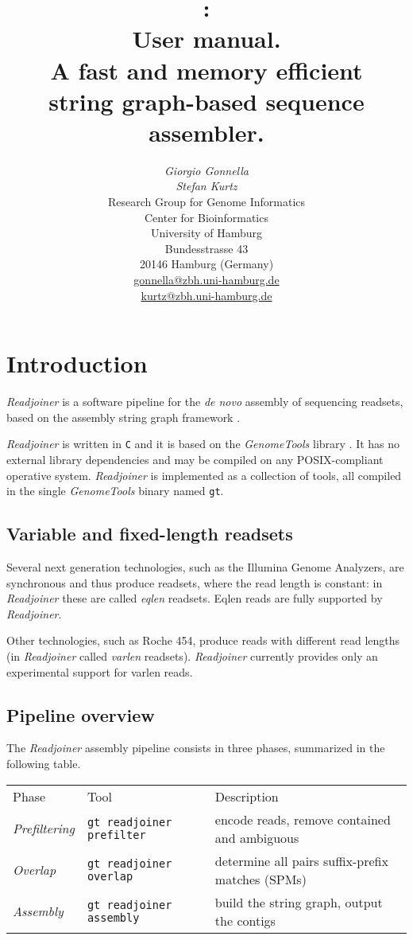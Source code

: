 \documentclass[12pt,titlepage]{article}
\title{\Huge{\Readjoiner 1.1:\\ User manual.}\\[3mm]
\Large{A fast and memory efficient \\string
 graph-based sequence assembler.}}
\author{\begin{tabular}{c}
         \textit{Giorgio Gonnella}\\
         \textit{Stefan Kurtz}\\[2cm]
         Research Group for Genome Informatics\\
         Center for Bioinformatics\\
         University of Hamburg\\
         Bundesstrasse 43\\
         20146 Hamburg (Germany)\\[1cm]
         \url{gonnella@zbh.uni-hamburg.de}\\
         \url{kurtz@zbh.uni-hamburg.de}\\[1cm]
        \end{tabular}}
\newcommand{\GenomeTools}{\textit{GenomeTools}\xspace}
\newcommand{\Readjoiner}{\textit{Readjoiner}\xspace}
\newcommand{\Gtcmd}{\texttt{gt}\xspace}
\newcommand{\Rdjprefiltercmd}{\texttt{gt readjoiner prefilter}\xspace}
\newcommand{\Rdjoverlapcmd}{\texttt{gt readjoiner overlap}\xspace}
\newcommand{\Rdjassemblycmd}{\texttt{gt readjoiner assembly}\xspace}
\begin{document}
\maketitle

\section{Introduction} \label{Introduction}

\Readjoiner is a software pipeline for the \textit{de novo} assembly of
 sequencing readsets, based on the assembly string graph framework
  \cite{MYE:2005}.

\Readjoiner is written in \texttt{C} and it is based on the
\GenomeTools library \cite{genometools}. It has no external library
dependencies and may be compiled on any POSIX-compliant operative system.
 \Readjoiner is implemented as a collection of tools, all compiled in the single
\GenomeTools binary named \Gtcmd.

\subsection{Variable and fixed-length readsets}

Several next generation technologies, such
as the Illumina Genome Analyzers, are synchronous and thus produce
readsets, where the read length is constant: in \Readjoiner these
are called \textit{eqlen} readsets.
Eqlen reads are fully supported by \Readjoiner.

Other technologies, such as Roche 454, produce
reads with different read lengths (in \Readjoiner called \textit{varlen}
readsets). \Readjoiner currently provides only an experimental support for varlen reads.

\subsection{Pipeline overview}

The \Readjoiner assembly pipeline consists in three phases, summarized in the
 following table.

\begin{tabular}{lll}
Phase & Tool & Description \\
\textit{Prefiltering} & \Rdjprefiltercmd &
  encode reads, remove contained and ambiguous\\
\textit{Overlap}   & \Rdjoverlapcmd &
  determine all pairs suffix-prefix matches (SPMs) \\
\textit{Assembly}  & \Rdjassemblycmd &
 build the string graph, output the contigs \\
\end{tabular}
\end{document}
